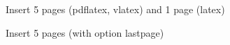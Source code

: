 \documentclass[a4paper,\myClassOptions]{article}
\begin{document}
Insert 5 pages (pdflatex, vlatex) and 1 page (latex)


Insert 5 pages (with option lastpage)

\end{document}

